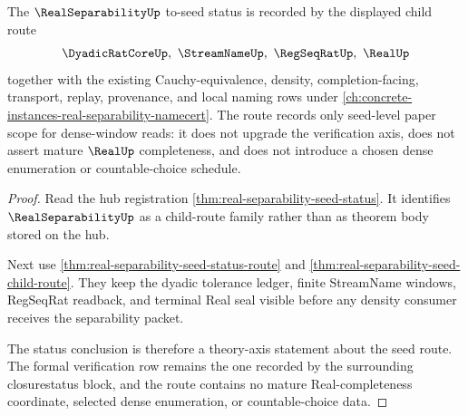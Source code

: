 \begin{theorem}
\label{thm:real-separability-to-seed-rotation-route}
The $\RealSeparabilityUp$ to-seed status is recorded by the displayed child route
$$
\DyadicRatCoreUp,\ \StreamNameUp,\ \RegSeqRatUp,\ \RealUp
$$
together with the existing Cauchy-equivalence, density, completion-facing, transport, replay, provenance, and local naming rows under \autoref{ch:concrete-instances-real-separability-namecert}. The route records only seed-level paper scope for dense-window reads: it does not upgrade the verification axis, does not assert mature $\RealUp$ completeness, and does not introduce a chosen dense enumeration or countable-choice schedule.
\end{theorem}
\begin{proof}
Read the hub registration \autoref{thm:real-separability-seed-status}. It identifies $\RealSeparabilityUp$ as a child-route family rather than as theorem body stored on the hub.

Next use \autoref{thm:real-separability-seed-status-route} and \autoref{thm:real-separability-seed-child-route}. They keep the dyadic tolerance ledger, finite StreamName windows, RegSeqRat readback, and terminal Real seal visible before any density consumer receives the separability packet.

The status conclusion is therefore a theory-axis statement about the seed route. The formal verification row remains the one recorded by the surrounding closurestatus block, and the route contains no mature Real-completeness coordinate, selected dense enumeration, or countable-choice data.
\end{proof}
